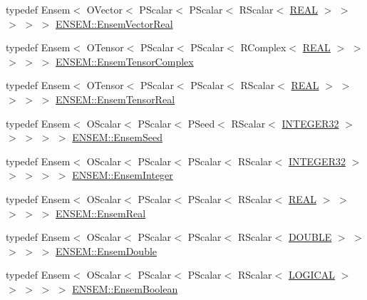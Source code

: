 \begin{DoxyCompactItemize}
\item 
typedef Ensem$<$ O\+Vector$<$ P\+Scalar$<$ P\+Scalar$<$ R\+Scalar$<$ \mbox{\hyperlink{adat-devel_2lib_2ensem_2ensem__precision_8h_ad013361bb53824d5957cb0b391c72290}{R\+E\+AL}} $>$ $>$ $>$ $>$ $>$ \mbox{\hyperlink{group__defs_gaa5c6b9de066b629db579dd1b6a585299}{E\+N\+S\+E\+M\+::\+Ensem\+Vector\+Real}}
\item 
typedef Ensem$<$ O\+Tensor$<$ P\+Scalar$<$ P\+Scalar$<$ R\+Complex$<$ \mbox{\hyperlink{adat-devel_2lib_2ensem_2ensem__precision_8h_ad013361bb53824d5957cb0b391c72290}{R\+E\+AL}} $>$ $>$ $>$ $>$ $>$ \mbox{\hyperlink{group__defs_ga3d22b4deb8e2322433882b290ff83364}{E\+N\+S\+E\+M\+::\+Ensem\+Tensor\+Complex}}
\item 
typedef Ensem$<$ O\+Tensor$<$ P\+Scalar$<$ P\+Scalar$<$ R\+Scalar$<$ \mbox{\hyperlink{adat-devel_2lib_2ensem_2ensem__precision_8h_ad013361bb53824d5957cb0b391c72290}{R\+E\+AL}} $>$ $>$ $>$ $>$ $>$ \mbox{\hyperlink{group__defs_ga39dae87ed68ca227f7c9025a6e0a55b7}{E\+N\+S\+E\+M\+::\+Ensem\+Tensor\+Real}}
\item 
typedef Ensem$<$ O\+Scalar$<$ P\+Scalar$<$ P\+Seed$<$ R\+Scalar$<$ \mbox{\hyperlink{adat-devel_2lib_2ensem_2ensem__precision_8h_af9ea51a62d33df371d837a018fe1a22e}{I\+N\+T\+E\+G\+E\+R32}} $>$ $>$ $>$ $>$ $>$ \mbox{\hyperlink{group__defs_ga698c2e3c5bf93dd51c61ca1234372463}{E\+N\+S\+E\+M\+::\+Ensem\+Seed}}
\item 
typedef Ensem$<$ O\+Scalar$<$ P\+Scalar$<$ P\+Scalar$<$ R\+Scalar$<$ \mbox{\hyperlink{adat-devel_2lib_2ensem_2ensem__precision_8h_af9ea51a62d33df371d837a018fe1a22e}{I\+N\+T\+E\+G\+E\+R32}} $>$ $>$ $>$ $>$ $>$ \mbox{\hyperlink{group__defs_gab547eddfe397a7c79b9a4278ab384a2e}{E\+N\+S\+E\+M\+::\+Ensem\+Integer}}
\item 
typedef Ensem$<$ O\+Scalar$<$ P\+Scalar$<$ P\+Scalar$<$ R\+Scalar$<$ \mbox{\hyperlink{adat-devel_2lib_2ensem_2ensem__precision_8h_ad013361bb53824d5957cb0b391c72290}{R\+E\+AL}} $>$ $>$ $>$ $>$ $>$ \mbox{\hyperlink{group__defs_ga358cdbc11379b9a4724ad42ae64374da}{E\+N\+S\+E\+M\+::\+Ensem\+Real}}
\item 
typedef Ensem$<$ O\+Scalar$<$ P\+Scalar$<$ P\+Scalar$<$ R\+Scalar$<$ \mbox{\hyperlink{adat-devel_2lib_2ensem_2ensem__precision_8h_abcfc24a032c589afd6af1f9e4da2d5af}{D\+O\+U\+B\+LE}} $>$ $>$ $>$ $>$ $>$ \mbox{\hyperlink{group__defs_gac42383c5825ab6504a44fe73b73027ad}{E\+N\+S\+E\+M\+::\+Ensem\+Double}}
\item 
typedef Ensem$<$ O\+Scalar$<$ P\+Scalar$<$ P\+Scalar$<$ R\+Scalar$<$ \mbox{\hyperlink{adat-devel_2lib_2ensem_2ensem__precision_8h_aae96530932e7073fe821140b57d9faff}{L\+O\+G\+I\+C\+AL}} $>$ $>$ $>$ $>$ $>$ \mbox{\hyperlink{group__defs_gac6945505f3ac714277458e0a944c15f0}{E\+N\+S\+E\+M\+::\+Ensem\+Boolean}}

\end{DoxyCompactItemize}
